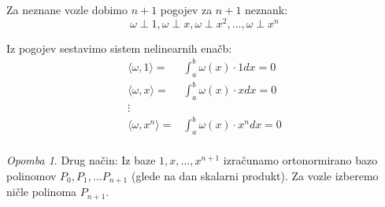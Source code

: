 \documentclass[a4paper,12pt]{article}
\newcommand{\innerproduct}[2]{\langle #1, #2 \rangle}
\theoremstyle{definition}
\theoremstyle{remark}
\newtheorem*{rem}{Opomba}
\begin{document}
Za neznane vozle dobimo $n + 1$ pogojev za $n + 1$ neznank:
\begin{equation*}
    \omega \perp 1, \omega \perp x, \omega \perp x^2, \dots, \omega \perp x^n
\end{equation*}

Iz pogojev sestavimo sistem nelinearnih enačb:
\begin{align*}
    \innerproduct{\omega}{1} =& \int_{a}^{b} \omega(x) \cdot 1 dx  = 0\\
    \innerproduct{\omega}{x} =& \int_{a}^{b} \omega(x) \cdot x dx  = 0\\
    \vdots\\
    \innerproduct{\omega}{x^n} =& \int_{a}^{b} \omega(x) \cdot x^n dx = 0\\
\end{align*}

\begin{rem}
    Drug način: Iz baze $1, x, \dots, x^{n+1}$ izračunamo ortonormirano bazo polinomov $P_0, P_1, \dots P_{n+1}$ (glede na dan skalarni produkt).
    Za vozle izberemo ničle polinoma $P_{n+1}$.
\end{rem}
\end{document}
